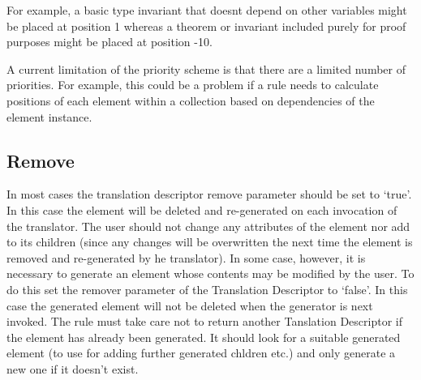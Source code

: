 For example, a basic type invariant that doesnt depend on other variables might be placed at position 1 whereas a theorem or invariant included purely for proof purposes might be placed at position -10. 

A current limitation of the priority scheme is that there are a limited number of priorities. For example, this could be a problem if a rule needs to calculate positions of each element within a collection based on dependencies of the element instance.

\subsection{Remove}
\label{sec:remove}
In most cases the translation descriptor remove parameter should be set to `true'. 
In this case the element will be deleted and re-generated on each invocation of the translator. 
The user should not change any attributes of the element nor add to its children (since any changes will be overwritten the next time the element is removed and re-generated by he translator). 
In some case, however, it is necessary to generate an element whose contents may be modified by the user. 
To do this set the remover parameter of the Translation Descriptor to `false'. 
In this case the generated element will not be deleted when the generator is next invoked. 
The rule must take care not to return another Tanslation Descriptor if the element has already been generated.
It should look for a suitable generated element (to use for adding further generated chldren etc.) and only generate a new one if it doesn't exist.

%
%


